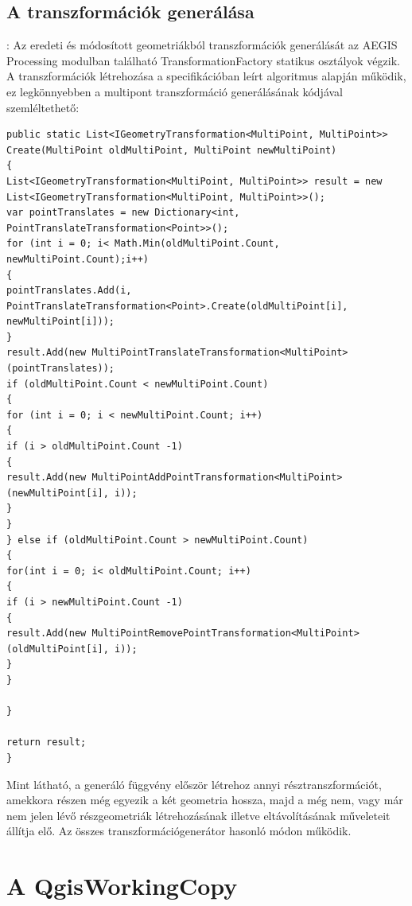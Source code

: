 \subsection{A transzformációk generálása}:
Az eredeti és módosított geometriákból transzformációk generálását az AEGIS Processing modulban található TransformationFactory statikus osztályok végzik.
A transzformációk létrehozása a specifikációban leírt algoritmus alapján működik, ez legkönnyebben a multipont transzformáció generálásának kódjával szemléltethető:
\begin{lstlisting}[language={[Sharp]C}]
public static List<IGeometryTransformation<MultiPoint, MultiPoint>> Create(MultiPoint oldMultiPoint, MultiPoint newMultiPoint)
{
List<IGeometryTransformation<MultiPoint, MultiPoint>> result = new List<IGeometryTransformation<MultiPoint, MultiPoint>>();
var pointTranslates = new Dictionary<int, PointTranslateTransformation<Point>>();
for (int i = 0; i< Math.Min(oldMultiPoint.Count, newMultiPoint.Count);i++)
{
pointTranslates.Add(i, PointTranslateTransformation<Point>.Create(oldMultiPoint[i], newMultiPoint[i]));
}
result.Add(new MultiPointTranslateTransformation<MultiPoint>(pointTranslates));
if (oldMultiPoint.Count < newMultiPoint.Count)
{
for (int i = 0; i < newMultiPoint.Count; i++)
{
if (i > oldMultiPoint.Count -1)
{
result.Add(new MultiPointAddPointTransformation<MultiPoint>(newMultiPoint[i], i));
}
}
} else if (oldMultiPoint.Count > newMultiPoint.Count)
{
for(int i = 0; i< oldMultiPoint.Count; i++)
{
if (i > newMultiPoint.Count -1)
{
result.Add(new MultiPointRemovePointTransformation<MultiPoint>(oldMultiPoint[i], i));
}
}

}

return result;
}
\end{lstlisting}
Mint látható, a generáló függvény először létrehoz annyi résztranszformációt, amekkora részen még egyezik a két geometria hossza, majd a még nem, vagy már nem jelen lévő részgeometriák létrehozásának illetve eltávolításának műveleteit állítja elő. Az összes transzformációgenerátor hasonló módon működik.

\section{A QgisWorkingCopy}
